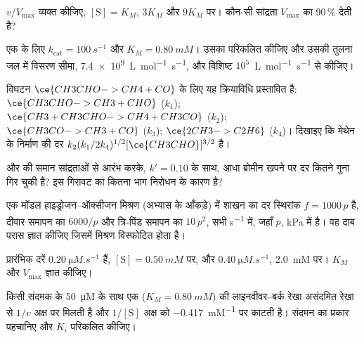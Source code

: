 \begin{exercise}[$\star$]\label{exo:b3:complex-kinetics:3}
$v/V_{\max}$ व्यक्त कीजिए, $[\mathrm S] = K_M$, $3K_M$ और $9K_M$ पर। कौन-सी सांद्रता
$V_{\max}$ का 90\,\% देती है?
\end{exercise}

\begin{exercise}[$\star$]\label{exo:b3:complex-kinetics:4}
एक  के लिए $k_{\mathrm{cat}} = \qty{100}{s^{-1}}$ और $K_M = \qty{0.80}{mM}$। उसका  परिकलित कीजिए और उसकी तुलना जल में विसरण सीमा, \qty{7.4e9}{L.mol^{-1}.s^{-1}},
और विशिष्ट $10^5$~\unit{L.mol^{-1}.s^{-1}} से कीजिए।
\end{exercise}

\begin{exercise}[$\star\star$]\label{exo:b3:complex-kinetics:5}
विघटन $\ce{CH3CHO -> CH4 + CO}$ के लिए यह क्रियाविधि प्रस्तावित है: $\ce{CH3CHO -> CH3 +
CHO}$ ($k_1$); $\ce{CH3 + CH3CHO -> CH4 + CH3CO}$ ($k_2$); $\ce{CH3CO -> CH3 + CO}$ ($k_3$);
$\ce{2 CH3 -> C2H6}$ ($k_4$)। दिखाइए कि मेथेन के निर्माण की दर
$k_2(k_1/2k_4)^{1/2}[\ce{CH3CHO}]^{3/2}$ है।
\end{exercise}

\begin{exercise}[$\star\star$]\label{exo:b3:complex-kinetics:6}
 और  की समान सांद्रताओं से आरंभ करके, $k' = 0.10$ के साथ, आधा
ब्रोमीन खपने पर दर कितने गुना गिर चुकी है? इस गिरावट का कितना भाग
निरोधन के कारण है?
\end{exercise}

\begin{exercise}[$\star\star$]\label{exo:b3:complex-kinetics:7}
एक मॉडल हाइड्रोजन--ऑक्सीजन मिश्रण (अभ्यास के आँकड़े) में शाखन का
दर स्थिरांक $f = 1000\,p$ है, दीवार समापन का $6000/p$ और त्रि-पिंड समापन का
$10\,p^2$, सभी \unit{s^{-1}} में, जहाँ $p$, kPa में है। वह दाब परास ज्ञात कीजिए जिसमें मिश्रण
विस्फोटित होता है।
\end{exercise}

\begin{exercise}[$\star\star$]\label{exo:b3:complex-kinetics:8}
प्रारंभिक दरें $\qty{0.20}{\micro M.s^{-1}}$ हैं, $[\mathrm S] = \qty{0.50}{mM}$ पर, और $\qty{0.40}{\micro M.s^{-1}}$,
\qty{2.0}{mM} पर। $K_M$ और $V_{\max}$ ज्ञात कीजिए।
\end{exercise}

\begin{exercise}[$\star\star$]\label{exo:b3:complex-kinetics:9}
किसी संदमक के \qty{50}{\micro M} के साथ एक 
($K_M = \qty{0.80}{mM}$) की लाइनवीवर--बर्क रेखा असंदमित रेखा से $1/v$ अक्ष पर मिलती है और
$1/[\mathrm S]$ अक्ष को \qty{-0.417}{mM^{-1}} पर काटती है। संदमन का प्रकार पहचानिए और $K_i$ परिकलित कीजिए।
\end{exercise}

